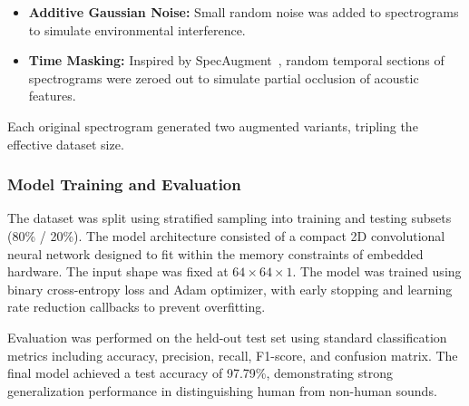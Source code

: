 \begin{itemize}
  \item \textbf{Additive Gaussian Noise:} Small random noise was added to spectrograms to simulate environmental interference.
  \item \textbf{Time Masking:} Inspired by SpecAugment~\cite{Park2019specaugment}, random temporal sections of spectrograms were zeroed out to simulate partial occlusion of acoustic features.
\end{itemize}

Each original spectrogram generated two augmented variants, tripling the effective dataset size.

\subsubsection{Model Training and Evaluation}
The dataset was split using stratified sampling into training and testing subsets (80\% / 20\%). The model architecture consisted of a compact 2D convolutional neural network designed to fit within the memory constraints of embedded hardware. The input shape was fixed at $64 \times 64 \times 1$. The model was trained using binary cross-entropy loss and Adam optimizer, with early stopping and learning rate reduction callbacks to prevent overfitting.

Evaluation was performed on the held-out test set using standard classification metrics including accuracy, precision, recall, F1-score, and confusion matrix. The final model achieved a test accuracy of 97.79\%, demonstrating strong generalization performance in distinguishing human from non-human sounds.

